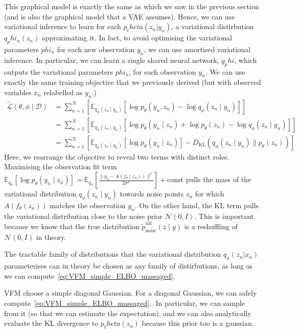 \documentclass[12pt,a4paper]{report}
\begin{document}
This graphical model is exactly the same as which we saw in the previous section (and is also the graphical model that a VAE assumes). 
Hence, we can use variational inference to learn for each $p_theta(z_n| y_n)$, a variational distirbution $q_phi_n(z_n)$ approximating it. 
In fact, to avoid optimising the variational parameters $phi_n$ for each new observation $y_n$, we can use amortised variational inference. 
In particular, we can learn a single shared neural network, $g_phi$, which outputs the variational parameters $phi_n$, for each observation $y_n$.  
We can use exactly the same training objective that we previously derived (but with observed variables $x_n$ relabelled as $y_n$.)
\begin{align}
\tilde{\mathcal{L}}(\theta, \phi \mid \mathcal{D}) &= \sum_{n=1}^N \left[ \mathbb{E}_{q_\phi(z_n \mid y_n)} [\log p_\theta(y_n, z_n) - \log q_\phi(z_n \mid y_n)] \right] \label{eq:VFM_simple_ELBO} \\
&= \sum_{n=1}^N \left[ \mathbb{E}_{q_\phi(z_n \mid y_n)} [\log p_\theta(y_n \mid z_n) + \log p_\theta(z_n) - \log q_\phi(z_n \mid y_n)] \right] \nonumber \\
&= \sum_{n=1}^N \left[ \mathbb{E}_{q_\phi(z_n \mid y_n)} [\log p_\theta(y_n \mid z_n)] - D_{\text{KL}}(q_\phi(z_n \mid y_n) \parallel p_\theta(z_n)) \right] \label{eq:VFM_simple_ELBO_massaged} 
\end{align}
Here, we rearrange the objective to reveal two terms with distinct roles. 
 Maximising the observation fit term $\mathbb{E}_{q_\phi} [\log p_\theta(y_n \mid z_n)] = \mathbb{E}_{q_\phi}\left[ \frac{\|y_n - A(f_\theta(z_n))\|^2}{2\sigma^2} \right] + \text{const}$ pulls the mass of the variational distribution $q_\phi(z_n \mid y_n)$ towards noise points $z_n$ for which $A(f_\theta(z_n))$ matches the observation $y_n$. On the other hand, the KL term pulls the variational distribution close to the noise prior $\mathcal{N}(0, I)$. This is important because we know that the true distribution $\widetilde p^{\text{tilt}}_{\text{noise}}(z \mid y)$ is a reshuffling of $\mathcal{N}(0, I)$ in theory. 

The tractable family of distributions that the variational distribution $q_\phi(z_n | x_n)$ parameterises can in theory be chosen as any family of distirbutions, as long as we can compute~\ref{eq:VFM_simple_ELBO_massaged}. 

VFM choose a simple diagonal Gaussian. 
For a diagonal Gaussian, we can safely compute~\ref{eq:VFM_simple_ELBO_massaged}.. 
In particular, we can sample from it (so that we can estimate the expectation), and we can also analytically evaluate the KL divergence to $p_theta(z_n)$ because this prior too is a gaussian. 
\end{document}
